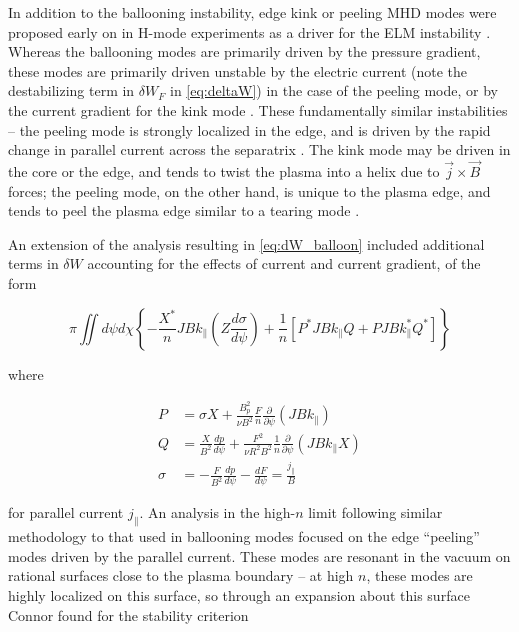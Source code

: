 In addition to the ballooning instability, edge kink or peeling MHD modes were proposed early on in H-mode experiments as a driver for the ELM instability \cite{Keilhacker1984,Zohm1996}.  Whereas the ballooning modes are primarily driven by the pressure gradient, these modes are primarily driven unstable by the electric current (note the destabilizing term in $\delta W_F$ in \cref{eq:deltaW}) in the case of the peeling mode, or by the current gradient for the kink mode \cite{Wilson2006}.  These fundamentally similar instabilities -- the peeling mode is strongly localized in the edge, and is driven by the rapid change in parallel current across the separatrix \cite{Wilson2006,Connor1998a}.  The kink mode may be driven in the core or the edge, and tends to twist the plasma into a helix due to $\vec{j} \times \vec{B}$ forces; the peeling mode, on the other hand, is unique to the plasma edge, and tends to peel the plasma edge similar to a tearing mode \cite{Wilson1999}.

An extension of the analysis resulting in \cref{eq:dW_balloon} \cite{Connor1979} included additional terms in $\delta W$ accounting for the effects of current and current gradient, of the form

\begin{equation}\label{eq:dW_balloon_current}
  \pi \iint d\psi d\chi \left\{ - \frac{X^*}{n} JB k_\parallel \left( Z \frac{d \sigma}{d \psi} \right) + \frac{1}{n} \left[ P^* JB k_\parallel Q + PJBk_\parallel^* Q^* \right] \right\}
\end{equation}

\noindent where

\begin{equation}
 \begin{aligned}
  P &= \sigma X + \frac{B_p^2}{\nu B^2} \frac{F}{n} \frac{\partial}{\partial \psi} \left( JBk_\parallel \right)\\
  Q &= \frac{X}{B^2} \frac{dp}{d\psi} + \frac{F^2}{\nu R^2 B^2} \frac{1}{n} \frac{\partial}{\partial \psi} \left( JBk_\parallel X \right)\\
  \sigma &= -\frac{F}{B^2} \frac{dp}{d\psi} - \frac{dF}{d\psi} = \frac{j_\parallel}{B}
 \end{aligned}
\end{equation}

\noindent for parallel current $j_\parallel$.  An analysis in the high-$n$ limit following similar methodology to that used in ballooning modes \cite{Connor1998a} focused on the edge ``peeling'' modes driven by the parallel current.  These modes are resonant in the vacuum on rational surfaces close to the plasma boundary -- at high $n$, these modes are highly localized on this surface, so through an expansion about this surface Connor \etal \cite{Connor1998a} found for the stability criterion


